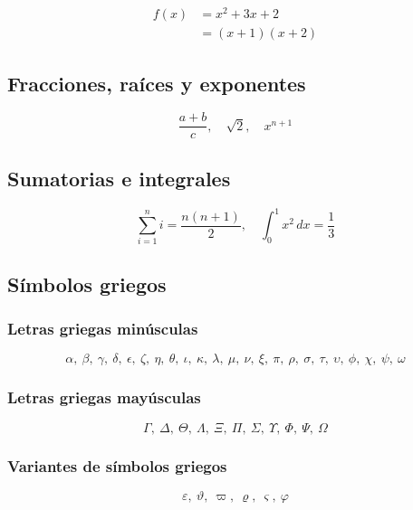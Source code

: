 \begin{align}
	f(x) &= x^2 + 3x + 2 \\
	&= (x+1)(x+2)
\end{align}

\subsection{Fracciones, raíces y exponentes}

\[
\frac{a + b}{c}, \quad \sqrt{2}, \quad x^{n+1}
\]

\subsection{Sumatorias e integrales}

\[
\sum_{i=1}^{n} i = \frac{n(n+1)}{2}, \quad \int_0^1 x^2\,dx = \frac{1}{3}
\]

\subsection{Símbolos griegos}

\subsubsection{Letras griegas minúsculas}

\[
\alpha, \ \beta, \ \gamma, \ \delta, \ \epsilon, \ \zeta, \ \eta, \ \theta, \ \iota, \ \kappa, \ \lambda, \ \mu, \ \nu, \ \xi, \ \pi, \ \rho, \ \sigma, \ \tau, \ \upsilon, \ \phi, \ \chi, \ \psi, \ \omega
\]

\subsubsection{Letras griegas mayúsculas}

\[
\Gamma, \ \Delta, \ \Theta, \ \Lambda, \ \Xi, \ \Pi, \ \Sigma, \ \Upsilon, \ \Phi, \ \Psi, \ \Omega
\]

\subsubsection{Variantes de símbolos griegos}

\[
\varepsilon, \ \vartheta, \ \varpi, \ \varrho, \ \varsigma, \ \varphi
\]

